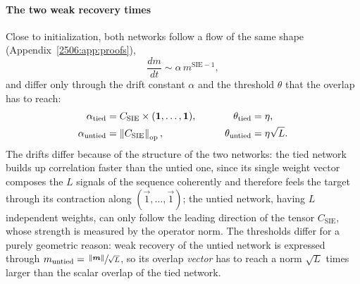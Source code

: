 \paragraph{The two weak recovery times}
Close to initialization, both networks follow a flow of the same shape (Appendix~\ref{2506:app:proofs}),
\begin{equation} \label{2506:eq:app:generic-flow}
    \frac{dm}{dt} \sim \alpha\, m^{\mathrm{SIE}-1},
\end{equation}
and differ only through the drift constant \(\alpha\) and the threshold \(\theta\) that the overlap has to reach:
\begin{equation} \label{2506:eq:app:drift-threshold}
    \begin{aligned}
        \alpha_\mathrm{tied} &= C_\mathrm{SIE} \times ({\boldsymbol{1}},\dots,{\boldsymbol{1}}), &\qquad \theta_\mathrm{tied} &= \eta, \\
        \alpha_\mathrm{untied} &= \left\lVert C_\mathrm{SIE}\right\rVert_\mathrm{op}, &\qquad \theta_\mathrm{untied} &= \eta\sqrt{L}.
    \end{aligned}
\end{equation}
The drifts differ because of the structure of the two networks: the tied network builds up correlation faster than the untied one, since its single weight vector composes the \(L\) signals of the sequence coherently and therefore feels the target through its contraction along \((\vec{1},\dots,\vec{1})\); the untied network, having \(L\) independent weights, can only follow the leading direction of the tensor \(C_\mathrm{SIE}\), whose strength is measured by the operator norm. The thresholds differ for a purely geometric reason: weak recovery of the untied network is expressed through \(m_\mathrm{untied} = \sfrac{\left\lVert {\boldsymbol{m}}\right\rVert}{\sqrt{L}}\), so its overlap \emph{vector} has to reach a norm \(\sqrt{L}\) times larger than the scalar overlap of the tied network.

